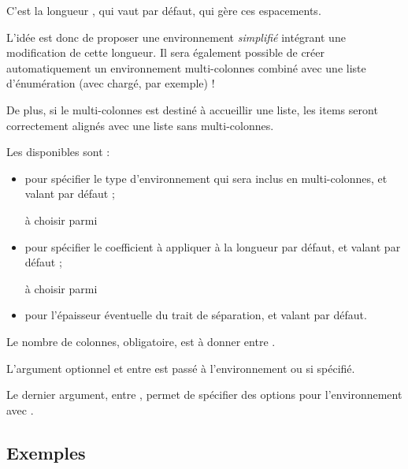 \documentclass[french,11pt,a4paper]{article}
\begin{document}
C'est la longueur , qui vaut  par défaut, qui gère ces espacements.

\smallskip

L'idée est donc de proposer une environnement \textit{simplifié} intégrant une modification de cette longueur. Il sera également possible de créer automatiquement un environnement multi-colonnes combiné avec une liste d'énumération (avec  chargé, par exemple) !

De plus, si le multi-colonnes est destiné à accueillir une liste, les items seront correctement alignés avec une liste sans multi-colonnes.


Les  disponibles sont :

\begin{itemize}
	\item {} pour spécifier le type d'environnement qui sera inclus en multi-colonnes, et valant  par défaut ;
	
	\hfill{}à choisir parmi 
	\item {} pour spécifier le coefficient à appliquer à la longueur par défaut, et valant  par défaut ;
	
	\hfill{}à choisir parmi 
	\item {} pour l'épaisseur éventuelle du trait de séparation, et valant \MontreCode{0pt} par défaut.
\end{itemize}

Le nombre de colonnes, obligatoire, est à donner entre .

L'argument optionnel et entre  est passé à l'environnement  ou  si spécifié.

Le dernier argument, entre , permet de spécifier des options pour l'environnement  avec .

\subsection{Exemples}
\end{document}
